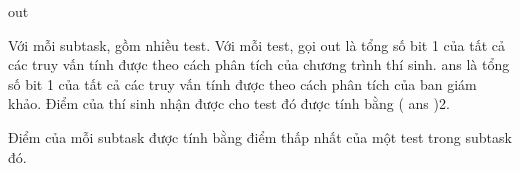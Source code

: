 \hfill\break

out

Với mỗi subtask, gồm nhiều test. Với mỗi test, gọi {out }là tổng số bit
1 của tất cả các truy vấn tính được theo cách phân tích của chương trình
thí sinh. {ans }là tổng số bit 1 của tất cả các truy vấn tính được theo
cách phân tích của ban giám khảo. Điểm của thí sinh nhận được cho test
đó được tính bằng {( }{ans}{ }{)}{2}.

Điểm của mỗi subtask được tính bằng điểm thấp nhất của một test trong
subtask đó.
